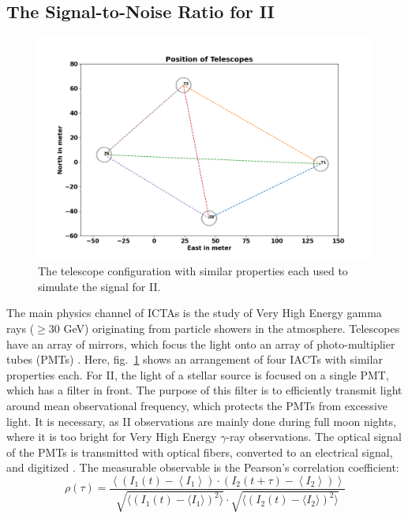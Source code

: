 \subsection{The Signal-to-Noise Ratio for II}
\begin{figure}
	\centering
	\includegraphics[width=\linewidth]{fig/telescope.png}
	\caption{The telescope configuration with similar properties each used to simulate the signal for II.}
	\label{fig:teles}
\end{figure}
The main physics channel of ICTAs is the study of Very High Energy gamma rays ($\geq 30$ GeV) originating from particle showers in the atmosphere. Telescopes have an array of mirrors, which focus the light onto an array of photo-multiplier tubes (PMTs) \citep{aleksic2016major}. Here, fig.~\ref{fig:teles} shows an arrangement of four IACTs with similar properties each. For II, the light of a stellar source is focused on a single PMT, which has a filter in front. The purpose of this filter is to efficiently transmit light around mean observational frequency, which protects the PMTs from excessive light. It is necessary, as II observations are mainly done during full moon nights, where it is too bright for Very High Energy $\gamma$-ray observations. The optical signal of the PMTs is transmitted with optical fibers, converted to an electrical signal, and digitized \citep{acciari2020optical}. The measurable observable is the Pearson's correlation coefficient:
\begin{equation}
	\rho(\tau) = \frac{\left\langle \left( I_1(t) - \left\langle I_1 \right\rangle \right) \cdot \left( I_2(t + \tau) - \left\langle I_2 \right\rangle \right) \right\rangle}{\sqrt{\langle \left( I_1(t) - \langle I_1 \rangle \right)^2 \rangle} \cdot \sqrt{\langle \left( I_2(t) - \langle I_2 \rangle \right) ^2 \rangle}}
	\label{eqn:pearson}
\end{equation}
